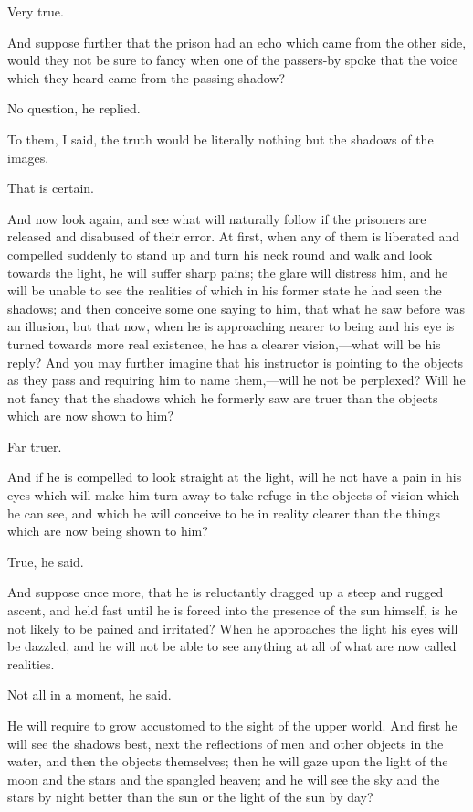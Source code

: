 Very true.

And suppose further that the prison had an echo which came from the
other side, would they not be sure to fancy when one of the passers-by
spoke that the voice which they heard came from the passing shadow?

No question, he replied.

To them, I said, the truth would be literally nothing but the shadows
of the images.

That is certain.

And now look again, and see what will naturally follow if the
prisoners are released and disabused of their error. At first, when
any of them is liberated and compelled suddenly to stand up and turn
his neck round and walk and look towards the light, he will suffer
sharp pains; the glare will distress him, and he will be unable to see
the realities of which in his former state he had seen the shadows;
and then conceive some one saying to him, that what he saw before was
an illusion, but that now, when he is approaching nearer to being and
his eye is turned towards more real existence, he has a clearer
vi\-sion,---what will be his reply? And you may further imagine that
his instructor is pointing to the objects as they pass and requiring
him to name them,---will he not be perplexed? Will he not fancy that
the shadows which he formerly saw are truer than the objects which are
now shown to him?

Far truer.

And if he is compelled to look straight at the light, will he not have
a pain in his eyes which will make him turn away to take refuge in the
objects of vision which he can see, and which he will conceive to be
in reality clearer than the things which are now being shown to him?

True, he said.

And suppose once more, that he is reluctantly dragged up a steep and
rugged ascent, and held fast until he is forced into the presence of
the sun himself, is he not likely to be pained and irritated? When he
approaches the light his eyes will be dazzled, and he will not be able
to see anything at all of what are now called realities.

Not all in a moment, he said.

He will require to grow accustomed to the sight of the upper world.
And first he will see the shadows best, next the reflections of men
and other objects in the water, and then the objects themselves; then
he will gaze upon the light of the moon and the stars and the spangled
heaven; and he will see the sky and the stars by night better than the
sun or the light of the sun by day?

